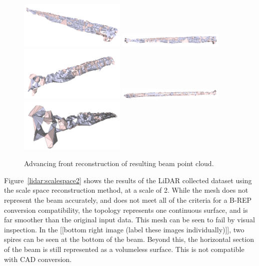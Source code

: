 \documentclass[12pt]{drexelthesis}
\begin{document}
\begin{figure}[!ht]
	\centering
		\includegraphics[width=2in]{real-lab-scans/meshed/advancedfront00.png}
		\includegraphics[width=2in]{real-lab-scans/meshed/advancedfront01.png}
		\includegraphics[width=2in]{real-lab-scans/meshed/advancedfront02.png}
		\includegraphics[width=2in]{real-lab-scans/meshed/advancedfront03.png}
		\includegraphics[width=2in]{real-lab-scans/meshed/advancedfront04.png}
		\caption[Advancing front reconstruction of segmented LiDAR data]{\centering Advancing front reconstruction of resulting beam point cloud.}
	\label{lidar:advancefront}
\end{figure}

Figure~\ref{lidar:scalespace2} shows the results of the LiDAR collected dataset using the scale space reconstruction method, at a scale of 2. While the mesh does not represent the beam accurately, and does not meet all of the criteria for a B-REP conversion compatibility, the topology represents one continuous surface, and is far smoother than the original input data. This mesh can be seen to fail by visual inspection. In the [[bottom right image (label these images individually)]], two spires can be seen at the bottom of the beam. Beyond this, the horizontal section of the beam is still represented as a volumeless surface. This is not compatible with CAD conversion.
\end{document}
